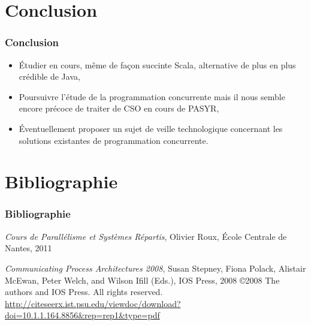 \documentclass[slidetop,11pt]{beamer}
\begin{document}
\section{Conclusion}
\begin{frame}
\frametitle{Conclusion}
\begin{itemize}[<+->]
\item \'Etudier en cours, même de façon succinte Scala, alternative de plus en plus crédible de Java,
\item Poursuivre l'étude de la programmation concurrente mais il nous semble encore précoce de traiter de CSO en cours de PASYR,
\item \'Eventuellement proposer un sujet de veille technologique concernant les solutions existantes de programmation concurrente.
\end{itemize}
\end{frame}

\section{Bibliographie}

\begin{frame} 
\frametitle{Bibliographie}

\begin{thebibliography}{Cpa2008}
 {\textit{Cours de Parallélisme et Systèmes Répartis}, Olivier Roux, \'Ecole Centrale de Nantes, 2011}

 {\textit{Communicating Process Architectures 2008}, Susan Stepney, Fiona Polack, Alistair McEwan, Peter Welch, and Wilson Ifill (Eds.), IOS Press, 2008
\copyright 2008 The authors and IOS Press. All rights reserved.\\
\url{http://citeseerx.ist.psu.edu/viewdoc/download?doi=10.1.1.164.8856&rep=rep1&type=pdf}}
\end{thebibliography}
\end{frame}
\end{document}

